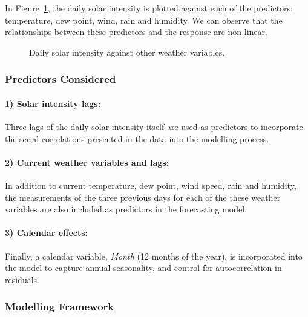 \documentclass[
  11pt,
  a4paper,
]{article}
\begin{document}
In Figure~\ref{fig-preds}, the daily solar intensity is plotted against
each of the predictors: temperature, dew point, wind, rain and humidity.
We can observe that the relationships between these predictors and the
response are non-linear.

\begin{figure}


\caption{\label{fig-preds}Daily solar intensity against other weather
variables.}

\end{figure}%

\subsubsection{Predictors Considered}\label{predictors-considered-1}

\paragraph{1) Solar intensity lags:}\label{solar-intensity-lags}

Three lags of the daily solar intensity itself are used as predictors to
incorporate the serial correlations presented in the data into the
modelling process.

\paragraph{2) Current weather variables and
lags:}\label{current-weather-variables-and-lags}

In addition to current temperature, dew point, wind speed, rain and
humidity, the measurements of the three previous days for each of the
these weather variables are also included as predictors in the
forecasting model.

\paragraph{3) Calendar effects:}\label{calendar-effects-1}

Finally, a calendar variable, \emph{Month} (12 months of the year), is
incorporated into the model to capture annual seasonality, and control
for autocorrelation in residuals.

\subsubsection{Modelling Framework}\label{modelling-framework-1}
\end{document}
